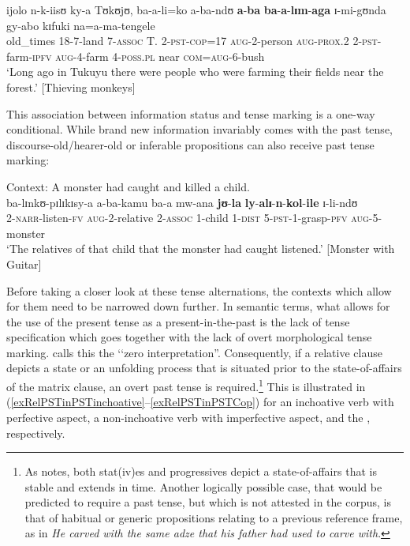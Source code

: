 \begin{exe}
\ex \label{exRelativeClausePSTorientation}%
\gll ijolo n-k-iisʊ ky-a Tʊkʊjʊ, ba-a-li=ko a-ba-ndʊ \textbf{a}-\textbf{ba} \textbf{ba}-\textbf{a}-\textbf{lɪm}-\textbf{aga} ɪ-mi-gʊnda gy-abo kɪfuki na=a-ma-tengele\\
old\_times 18-7-land 7-\textsc{assoc} T. 2-\textsc{pst}-\textsc{cop}=17 \textsc{aug}-2-person \textsc{aug}-\textsc{prox.2} 2-\textsc{pst}-farm-\textsc{ipfv} \textsc{aug}-4-farm 4-\textsc{poss.pl} near \textsc{com}=\textsc{aug}-6-bush\\
\glt \lq Long ago in Tukuyu there were people who were farming their fields near the forest.' [Thieving monkeys] 
\end{exe}

\largerpage
This association between information status and tense marking is a one-way conditional. While brand new information invariably comes with the past tense, discourse-old/hearer-old or inferable propositions can also receive past tense marking:

\begin{exe}
\ex \label{exRelativeClausePSTalsoOldInformation}
Context: A monster had caught and killed a child.\\
\gll ba-lɪnkʊ-pɪlɪkɪsy-a a-ba-kamu ba-a mw-ana \textbf{jʊ}-\textbf{la} \textbf{ly}-\textbf{alɪ}-\textbf{n}-\textbf{kol}-\textbf{ile} ɪ-li-ndʊ\\
2-\textsc{narr}-listen-\textsc{fv} \textsc{aug}-2-relative 2-\textsc{assoc} 1-child 1-\textsc{dist} 5-\textsc{pst}-1-grasp-\textsc{pfv} \textsc{aug}-5-monster\\
\glt \lq The relatives of that child that the monster had caught listened.'
[Monster with Guitar]
\end{exe}

Before taking a closer look at these tense alternations, the contexts which allow for them need to be narrowed down further. In semantic terms, what allows for the use of the present tense as a present-in-the-past is the lack of tense specification which goes together with the lack of overt morphological tense marking. \citet{FleischmanS1990} calls this the \lq\lq zero interpretation''. Consequently, if a relative clause depicts a state or an unfolding process that is situated prior to the state-of-affairs of the matrix clause, an overt past tense is required.\footnote{As \citet[84]{SmithC1997} notes, both stat(iv)es and progressives depict a state-of-affairs that is stable and extends in time. Another logically possible case, that would be predicted to require a past tense, but which is not attested in the corpus, is that of habitual or generic propositions relating to a previous reference frame, as in \textit{He carved with the same adze that his father had used to carve with}.} This is illustrated in (\ref{exRelPSTinPSTinchoative}--\ref{exRelPSTinPSTCop}) for an inchoative verb with perfective aspect, a non-inchoative verb with imperfective aspect, and the , respectively.


